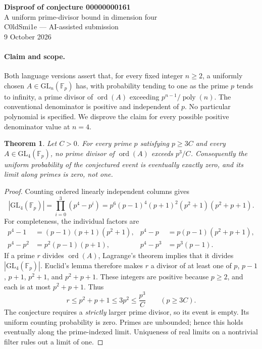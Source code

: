 \documentclass[11pt]{article}
\newtheorem{theorem}{Theorem}
\newcommand{\GL}{\mathrm{GL}}
\newcommand{\Fp}{\mathbb F_p}
\newcommand{\ord}{\operatorname{ord}}
\begin{document}
\begin{center}
{\Large\bfseries Disproof of conjecture 00000000161}\\[5pt]
{\large A uniform prime-divisor bound in dimension four}\\[7pt]
C0ldSmi1e \quad --- \quad AI-assisted submission\\
9 October 2026
\end{center}

\paragraph{Claim and scope.}
Both language versions assert that, for every fixed integer $n\ge2$, a uniformly
chosen $A\in\GL_n(\Fp)$ has, with probability tending to one as the prime $p$
tends to infinity, a prime divisor of $\ord(A)$ exceeding
$p^{n-1}/\operatorname{poly}(n)$. The conventional denominator is positive and
independent of $p$. No particular polynomial is specified. We disprove the
claim for every possible positive denominator value at $n=4$.

\begin{theorem}
Let $C>0$. For every prime $p$ satisfying $p\ge3C$ and every
$A\in\GL_4(\Fp)$, no prime divisor of $\ord(A)$ exceeds $p^3/C$.
Consequently the uniform probability of the conjectured event is eventually
exactly zero, and its limit along primes is zero, not one.
\end{theorem}

\begin{proof}
Counting ordered linearly independent columns gives
\[
 |\GL_4(\Fp)|=\prod_{i=0}^{3}(p^4-p^i)
   =p^6(p-1)^4(p+1)^2(p^2+1)(p^2+p+1).
\]
For completeness, the individual factors are
\begin{align*}
 p^4-1&=(p-1)(p+1)(p^2+1),&
 p^4-p&=p(p-1)(p^2+p+1),\\
 p^4-p^2&=p^2(p-1)(p+1),&
 p^4-p^3&=p^3(p-1).
\end{align*}
If a prime $r$ divides $\ord(A)$, Lagrange's theorem implies that it divides
$|\GL_4(\Fp)|$. Euclid's lemma therefore makes $r$ a divisor of at least one of
$p$, $p-1$, $p+1$, $p^2+1$, and $p^2+p+1$. These integers are positive because
$p\ge2$, and each is at most $p^2+p+1$. Thus
\[
 r\le p^2+p+1\le3p^2\le\frac{p^3}{C}\qquad(p\ge3C).
\]
The conjecture requires a \emph{strictly} larger prime divisor, so its event
is empty. Its uniform counting probability is zero. Primes are unbounded;
hence this holds eventually along the prime-indexed limit. Uniqueness of real
limits on a nontrivial filter rules out a limit of one.
\end{proof}
\end{document}
